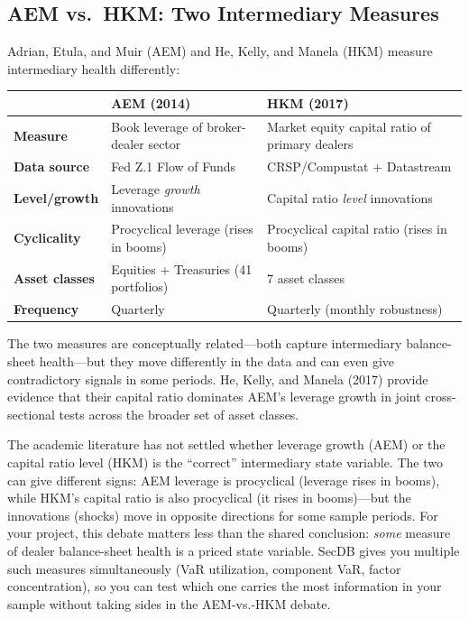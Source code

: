 \subsection{AEM vs.\ HKM: Two Intermediary Measures}

Adrian, Etula, and Muir (AEM) and He, Kelly, and Manela (HKM) measure intermediary health differently:

\begin{center}
\begin{tabular}{p{3.5cm} p{5cm} p{5cm}}
\toprule
& \textbf{AEM (2014)} & \textbf{HKM (2017)} \\
\midrule
\textbf{Measure} & Book leverage of broker-dealer sector & Market equity capital ratio of primary dealers \\
\textbf{Data source} & Fed Z.1 Flow of Funds & CRSP/Compustat + Datastream \\
\textbf{Level/growth} & Leverage \emph{growth} innovations & Capital ratio \emph{level} innovations \\
\textbf{Cyclicality} & Procyclical leverage (rises in booms) & Procyclical capital ratio (rises in booms) \\
\textbf{Asset classes} & Equities + Treasuries (41 portfolios) & 7 asset classes \\
\textbf{Frequency} & Quarterly & Quarterly (monthly robustness) \\
\bottomrule
\end{tabular}
\end{center}

The two measures are conceptually related---both capture intermediary balance-sheet health---but they move differently in the data and can even give contradictory signals in some periods. He, Kelly, and Manela (2017) provide evidence that their capital ratio dominates AEM's leverage growth in joint cross-sectional tests across the broader set of asset classes.

\begin{warning}
The academic literature has not settled whether leverage growth (AEM) or the capital ratio level (HKM) is the ``correct'' intermediary state variable. The two can give different signs: AEM leverage is procyclical (leverage rises in booms), while HKM's capital ratio is also procyclical (it rises in booms)---but the innovations (shocks) move in opposite directions for some sample periods. For your project, this debate matters less than the shared conclusion: \emph{some} measure of dealer balance-sheet health is a priced state variable. SecDB gives you multiple such measures simultaneously (VaR utilization, component VaR, factor concentration), so you can test which one carries the most information in your sample without taking sides in the AEM-vs.-HKM debate.
\end{warning}

